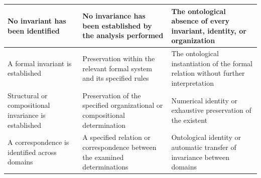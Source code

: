 \begin{table}[htbp]
\begin{tabular}{
        |p{}
        |p{}
        |p{}|
    }
        No invariant has been identified
        &
        No invariance has been established by the
        analysis performed
        &
        The ontological absence of every invariant,
        identity, or organization
        \\ \hline

        A formal invariant is established
        &
        Preservation within the relevant formal system
        and its specified rules
        &
        The ontological instantiation of the formal
        relation without further interpretation
        \\ \hline

        Structural or compositional invariance is established
        &
        Preservation of the specified organizational
        or compositional determination
        &
        Numerical identity or exhaustive preservation
        of the existent
        \\ \hline

        A correspondence is identified across domains
        &
        A specified relation or correspondence between
        the examined determinations
        &
        Ontological identity or automatic transfer
        of invariance between domains
        \\ \hline

    \end{tabular}
\end{table}

